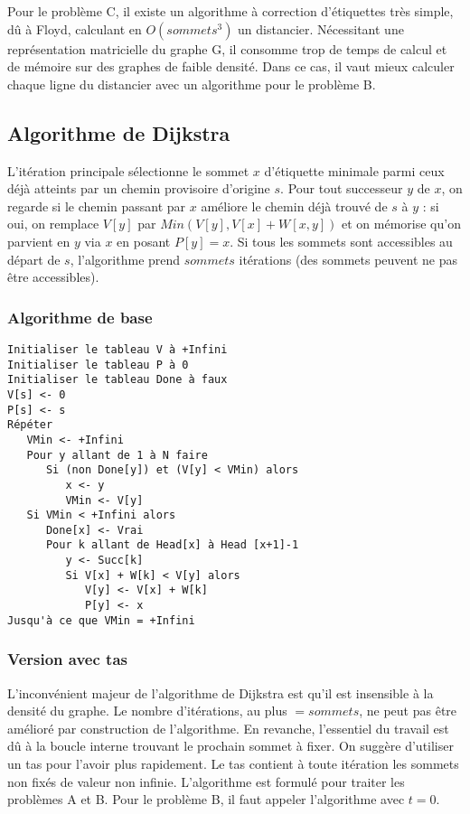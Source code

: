 \documentclass{article}
\begin{document}
\noindent Pour le problème C, il existe un algorithme à correction d’étiquettes très simple, dû à Floyd, calculant en $O(sommets^ 3)$ un distancier. Nécessitant une représentation 
matricielle du graphe G, il consomme trop de temps de calcul et de mémoire sur des graphes de faible densité. Dans ce cas, il vaut mieux calculer chaque ligne du distancier avec un 
algorithme pour le problème B.

\subsection{Algorithme de Dijkstra}

L’itération principale sélectionne le sommet $x$ d’étiquette minimale parmi ceux déjà atteints par un chemin provisoire d’origine $s$. Pour tout successeur $y$ de $x$, on regarde 
si le chemin passant par $x$ améliore le chemin déjà trouvé de $s$ à $y$ : si oui, on remplace $V[y]$ par $Min (V[y], V[x] + W[x,y])$ et on mémorise qu’on parvient en $y$ via 
$x$ en posant $P[y] = x$. Si tous les sommets sont accessibles au départ de $s$, l’algorithme prend $sommets$ itérations (des sommets peuvent ne pas être accessibles).

\subsubsection{Algorithme de base}

\begin{verbatim}
Initialiser le tableau V à +Infini
Initialiser le tableau P à 0
Initialiser le tableau Done à faux
V[s] <- 0
P[s] <- s
Répéter
   VMin <- +Infini
   Pour y allant de 1 à N faire
      Si (non Done[y]) et (V[y] < VMin) alors
         x <- y
         VMin <- V[y]
   Si VMin < +Infini alors
      Done[x] <- Vrai
      Pour k allant de Head[x] à Head [x+1]-1
         y <- Succ[k]
         Si V[x] + W[k] < V[y] alors
            V[y] <- V[x] + W[k]
            P[y] <- x
Jusqu'à ce que VMin = +Infini
\end{verbatim}

\subsubsection{Version avec tas}

L’inconvénient majeur de l’algorithme de Dijkstra est qu’il est insensible à la densité du graphe. Le nombre d’itérations, au plus $=sommets$, ne peut pas être amélioré par 
construction de l’algorithme. En revanche, l’essentiel du travail est dû à la boucle interne trouvant le prochain sommet à fixer. On suggère d’utiliser un tas pour l’avoir plus 
rapidement. Le tas contient à toute itération les sommets non fixés de valeur non infinie. L’algorithme est formulé pour traiter les problèmes A et B. Pour le problème B, il faut 
appeler l’algorithme avec $t=0$.
\end{document}
